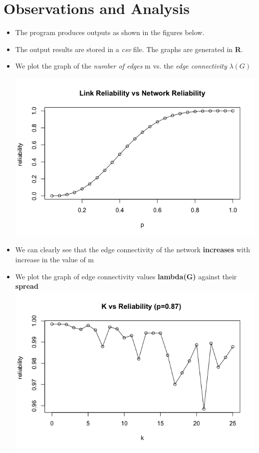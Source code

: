\documentclass[12pt,letterpaper,titlepage,en-US]{article}
\begin{document}
\section{Observations and Analysis}
\begin{itemize}


\item The program produces outputs as shown in the figures below.\\


 
\item The output results are stored in a \textit{csv} file. The graphs are generated in \textbf{R}.

\item We plot the graph of the \textit{number of edges} m vs. the \textit{edge connectivity} $\lambda(G)$

\includegraphics[scale=0.6]{fig/plot1.png}\\

\item We can clearly see that the edge connectivity of the network \textbf{increases} with increase in the value of m



\item We plot the graph of edge connectivity values \textbf{lambda(G)} against their \textbf{spread}\\

\includegraphics[scale=0.6]{fig/plot2.png}





\end{itemize}
\end{document}

